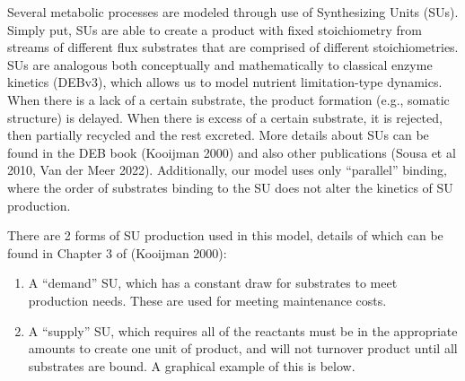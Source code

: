 \documentclass[
]{article}
\providecommand{\tightlist}{%
  \setlength{\itemsep}{0pt}\setlength{\parskip}{0pt}}
\begin{document}
Several metabolic processes are modeled through use of Synthesizing
Units (SUs). Simply put, SUs are able to create a product with fixed
stoichiometry from streams of different flux substrates that are
comprised of different stoichiometries. SUs are analogous both
conceptually and mathematically to classical enzyme kinetics (DEBv3),
which allows us to model nutrient limitation-type dynamics. When there
is a lack of a certain substrate, the product formation (e.g., somatic
structure) is delayed. When there is excess of a certain substrate, it
is rejected, then partially recycled and the rest excreted. More details
about SUs can be found in the DEB book (Kooijman 2000) and also other
publications (Sousa et al 2010, Van der Meer 2022). Additionally, our
model uses only ``parallel'' binding, where the order of substrates
binding to the SU does not alter the kinetics of SU production.

There are 2 forms of SU production used in this model, details of which
can be found in Chapter 3 of (Kooijman 2000):

\begin{enumerate}
\def\labelenumi{\arabic{enumi}.}
\tightlist
\item
  A ``demand'' SU, which has a constant draw for substrates to meet
  production needs. These are used for meeting maintenance costs.
\item
  A ``supply'' SU, which requires all of the reactants must be in the
  appropriate amounts to create one unit of product, and will not
  turnover product until all substrates are bound. A graphical example
  of this is below.
\end{enumerate}
\end{document}
